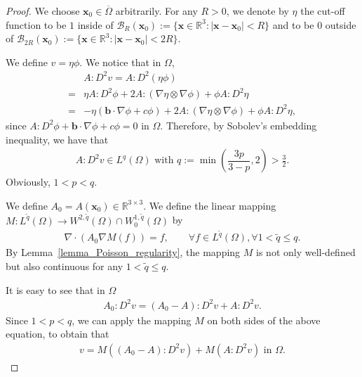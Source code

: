 \documentclass[12pt]{amsart}
\newcommand{\boldx}{\boldsymbol{x}}
\theoremstyle{definition}
\theoremstyle{remark}
\begin{document}
\begin{proof}
We choose $\boldx_{0} \in \overline{\Omega}$ arbitrarily. For any $R>0$, we denote by $\eta$ the cut-off function to be 
$1$ inside of $\mathcal{B}_{R}(\boldx_{0}):= \{ \boldx \in \mathbb{R}^{3}: \vert \boldx - \boldx_{0}\vert < R \}$ and 
to be $0$ outside of $\mathcal{B}_{2R}(\boldx_{0}):= \{ \boldx \in \mathbb{R}^{3}: \vert \boldx - \boldx_{0}\vert < 2R \}$.

We define $v = \eta \phi$. We notice that in $\Omega$, 
\begin{align*}
& A:D^{2}v = A:D^{2}(\eta \phi) \\ 
= & \eta A:D^{2}\phi + 2 A:(\nabla \eta \otimes \nabla \phi) + \phi A:D^{2} \eta \\ 
= & - \eta \left( \boldsymbol{b}\cdot \nabla \phi + c \phi \right)
+ 2 A:(\nabla \eta \otimes \nabla \phi) + \phi A:D^{2} \eta,
\end{align*}
since $A:D^{2}\phi + \boldsymbol{b}\cdot \nabla \phi + c \phi = 0$ in $\Omega$. 
Therefore, by Sobolev's embedding inequality, we have that 
\begin{align}
\label{improved_regularity1}
A:D^{2}v \in L^{q}(\Omega) \text{ with } q := \min (\dfrac{3p}{3-p}, 2) > \frac{3}{2}.
\end{align}
Obviously, $1 < p < q$.

We define $A_{0} = A(\boldx_{0}) \in \mathbb{R}^{3 \times 3}$. 
We define the linear mapping $M: L^{\tilde{q}}(\Omega) \rightarrow W^{2,\tilde{q}}(\Omega) 
\cap W_{0}^{1,\tilde{q}}(\Omega)$ by 
\begin{align*}
\nabla \cdot \left( A_{0} \nabla M(f) \right) = f,\qquad \forall f \in L^{\tilde{q}}(\Omega), 
\forall 1 < \tilde{q} \leq q.
\end{align*} 
By Lemma~\ref{lemma_Poisson_regularity}, 
the mapping $M$ is not only well-defined but also continuous 
for any $1 < \tilde{q} \leq q$.

It is easy to see that in $\Omega$
\begin{align*}
A_{0}:D^{2} v = (A_{0} - A):D^{2}v + A:D^{2}v.
\end{align*}
Since $1 < p < q$, we can 
apply the mapping $M$ on both sides of the above equation, to obtain that  
\begin{align*}
v = M \left( (A_{0} - A):D^{2}v \right) + M\left( A:D^{2} v \right) \text{ in } \Omega.
\end{align*}


\end{proof}
\end{document}

